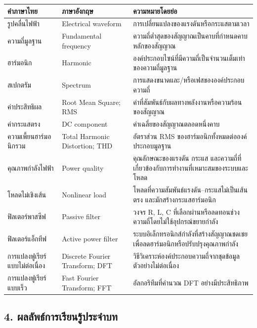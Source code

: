 \begin{table}[htbp]
    \centering
    \begin{tabularx}{\textwidth}{>{\raggedright\arraybackslash}p{} >{\raggedright\arraybackslash}p{} >{\raggedright\arraybackslash}X}
        \hline
        \textbf{คำภาษาไทย} & \textbf{ภาษาอังกฤษ} & \textbf{ความหมายโดยย่อ} \\
        \hline
        รูปคลื่นไฟฟ้า & Electrical waveform & การเปลี่ยนแปลงของแรงดันหรือกระแสตามเวลา \\
        ความถี่มูลฐาน & Fundamental frequency & ความถี่ต่ำสุดของสัญญาณเป็นคาบที่กำหนดคาบหลักของสัญญาณ \\
        ฮาร์มอนิก & Harmonic & องค์ประกอบไซน์ที่มีความถี่เป็นจำนวนเต็มเท่าของความถี่มูลฐาน \\
        สเปกตรัม & Spectrum & การแสดงขนาดและ/หรือเฟสขององค์ประกอบความถี่ \\
        ค่าประสิทธิผล & Root Mean Square; RMS & ค่าที่สัมพันธ์กับผลทางพลังงานหรือความร้อนของสัญญาณ \\
        ค่ากระแสตรง & DC component & ค่าเฉลี่ยของสัญญาณตลอดหนึ่งคาบ \\
        ความเพี้ยนฮาร์มอนิกรวม & Total Harmonic Distortion; THD & อัตราส่วน RMS ของฮาร์มอนิกทั้งหมดต่อองค์ประกอบมูลฐาน \\
        คุณภาพกำลังไฟฟ้า & Power quality & คุณลักษณะของแรงดัน กระแส และความถี่ที่เกี่ยวข้องกับการทำงานที่เหมาะสมของระบบและโหลด \\
        โหลดไม่เชิงเส้น & Nonlinear load & โหลดที่ความสัมพันธ์แรงดัน–กระแสไม่เป็นเส้นตรง และมักสร้างกระแสฮาร์มอนิก \\
        ฟิลเตอร์พาสซีฟ & Passive filter & วงจร R, L, C ที่เลือกผ่านหรือลดทอนช่วงความถี่โดยไม่ใช้อุปกรณ์ขยายกำลัง \\
        ฟิลเตอร์แอ็กทีฟ & Active power filter & ระบบอิเล็กทรอนิกส์กำลังที่สร้างสัญญาณชดเชยเพื่อลดฮาร์มอนิกหรือปรับปรุงคุณภาพกำลัง \\
        การแปลงฟูเรียร์แบบไม่ต่อเนื่อง & Discrete Fourier Transform; DFT & วิธีวิเคราะห์องค์ประกอบความถี่จากชุดข้อมูลตัวอย่างไม่ต่อเนื่อง \\
        การแปลงฟูเรียร์แบบเร็ว & Fast Fourier Transform; FFT & อัลกอริทึมที่คำนวณ DFT อย่างมีประสิทธิภาพ \\
        \hline
    \end{tabularx}
\end{table}



\subsection{4. ผลลัพธ์การเรียนรู้ประจำบท}

